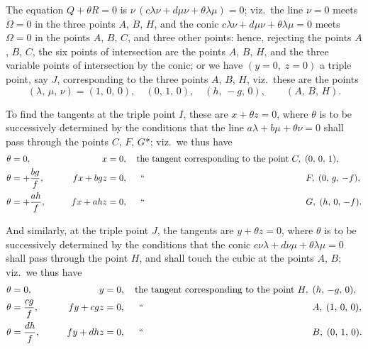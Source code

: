 \documentclass[11pt,a4paper]{book}
\begin{document}
The equation $Q+\theta R=0$ is $\nu\,(c\lambda\nu+d\mu\nu+\theta\lambda\mu)=0$; viz.\ the line $\nu=0$ meets $\Omega=0$ in the three points $A$, $B$, $H$, and the conic $c\lambda\nu+d\mu\nu+\theta\lambda\mu=0$ meets $\Omega=0$ in the points $A$, $B$, $C$, and three other points: hence, rejecting the points $A$, $B$, $C$, the six points of intersection are the points $A$, $B$, $H$, and the three variable points of intersection by the conic; or we have $(y=0,\; z=0)$ a triple point, say $J$, corresponding to the three points $A$, $B$, $H$, viz.\ these are the points
\[
(\lambda,\,\mu,\,\nu) = (1,\,0,\,0),\quad (0,\,1,\,0),\quad (h,\,-g,\,0), \qquad (A,\,B,\,H).
\]

To find the tangents at the triple point $I$, these are $x+\theta z=0$, where $\theta$ is to be successively determined by the conditions that the line $a\lambda+b\mu+\theta\nu=0$ shall pass through the points $C$, $F$, $G$*; viz.\ we thus have
\begin{alignat*}{3}
\theta &= 0, &\qquad x &= 0, \quad \text{the tangent corresponding to the point } C,\; (0,\,0,\,1), \\
\theta &= +\frac{bg}{f}, &\qquad fx+bgz &= 0, \quad\;\, \text{``\quad\quad\quad\quad\quad\quad\quad\quad\quad\quad\quad\quad\quad\quad\quad\quad\quad\quad} F,\; (0,\,g,\,-f), \\
\theta &= +\frac{ah}{f}, &\qquad fx+ahz &= 0, \quad\;\, \text{``\quad\quad\quad\quad\quad\quad\quad\quad\quad\quad\quad\quad\quad\quad\quad\quad\quad\quad} G,\; (h,\,0,\,-f).
\end{alignat*}

And similarly, at the triple point $J$, the tangents are $y+\theta z=0$, where $\theta$ is to be successively determined by the conditions that the conic $c\nu\lambda+d\nu\mu+\theta\lambda\mu=0$ shall pass through the point $H$, and shall touch the cubic at the points $A$, $B$; viz.\ we thus have
\begin{alignat*}{3}
\theta &= 0, &\qquad y &= 0, \quad \text{the tangent corresponding to the point } H,\; (h,\,-g,\,0), \\
\theta &= \frac{cg}{f}, &\qquad fy+cgz &= 0, \quad\;\, \text{``\quad\quad\quad\quad\quad\quad\quad\quad\quad\quad\quad\quad\quad\quad\quad\quad\quad\quad} A,\; (1,\,0,\,0), \\
\theta &= \frac{dh}{f}, &\qquad fy+dhz &= 0, \quad\;\, \text{``\quad\quad\quad\quad\quad\quad\quad\quad\quad\quad\quad\quad\quad\quad\quad\quad\quad\quad} B,\; (0,\,1,\,0).
\end{alignat*}
\end{document}
